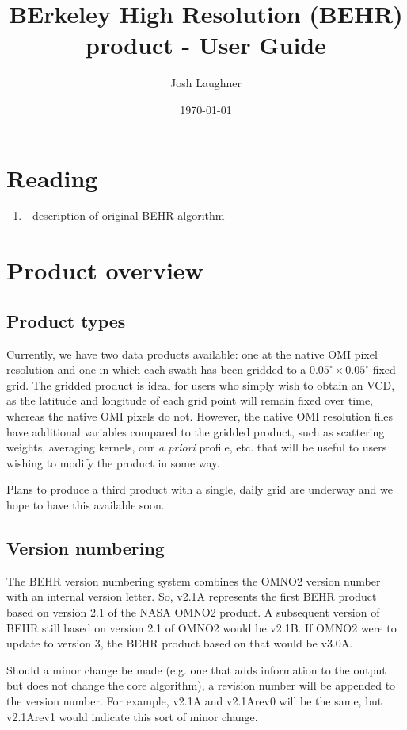 \documentclass[12pt]{article}
\title{BErkeley High Resolution (BEHR) \ce{NO2} product - User Guide}
\author{Josh Laughner}
\date{\today}
\begin{document}
\maketitle

\section{Reading}

	\begin{enumerate}
		\item \citet{russell11} - description of original BEHR algorithm
	\end{enumerate}


\section{Product overview}

	\subsection{Product types}
	Currently, we have two data products available: one at the native OMI pixel resolution and one in which each swath has been gridded to a $0.05^\circ \times 0.05^\circ$ fixed grid. The gridded product is ideal for users who simply wish to obtain an  VCD, as the latitude and longitude of each grid point will remain fixed over time, whereas the native OMI pixels do not. However, the native OMI resolution files have additional variables compared to the gridded product, such as scattering weights, averaging kernels, our  \emph{a priori} profile, etc. that will be useful to users wishing to modify the product in some way.
	
	Plans to produce a third product with a single, daily grid are underway and we hope to have this available soon.
	
	\subsection{Version numbering}
	The BEHR version numbering system combines the OMNO2 version number with an
internal version letter. So, v2.1A represents the first BEHR product based on
version 2.1 of the NASA OMNO2 product. A subsequent version of BEHR still based
on version 2.1 of OMNO2 would be v2.1B. If OMNO2 were to update to version 3,
the BEHR product based on that would be v3.0A.

	Should a minor change be made (e.g. one that adds information to the output but
does not change the core algorithm), a revision number will be appended to the
version number. For example, v2.1A and v2.1Arev0 will be the same, but v2.1Arev1
would indicate this sort of minor change.
\end{document}
